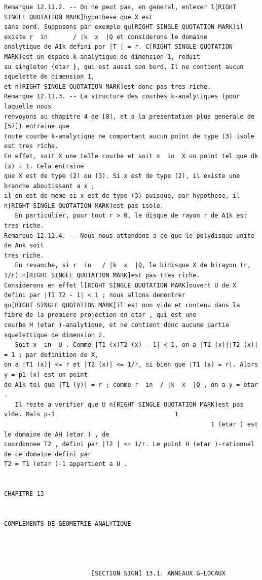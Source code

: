 \documentclass[
  11pt,
]{article}
\begin{document}
\begin{lstlisting}
Remarque 12.11.2. -- On ne peut pas, en general, enlever l[RIGHT SINGLE QUOTATION MARK]hypothese que X est
sans bord. Supposons par exemple qu[RIGHT SINGLE QUOTATION MARK]il existe r  in       / |k  x  |Q et considerons le domaine
analytique de A1k defini par |T | = r. C[RIGHT SINGLE QUOTATION MARK]est un espace k-analytique de dimension 1, reduit
au singleton {etar }, qui est aussi son bord. Il ne contient aucun squelette de dimension 1,
et n[RIGHT SINGLE QUOTATION MARK]est donc pas tres riche.
Remarque 12.11.3. -- La structure des courbes k-analytiques (pour laquelle nous
renvoyons au chapitre 4 de [8], et a la presentation plus generale de [57]) entraine que
toute courbe k-analytique ne comportant aucun point de type (3) isole est tres riche.
En effet, soit X une telle courbe et soit x  in  X un point tel que dk (x) = 1. Cela entraine
que X est de type (2) ou (3). Si x est de type (2), il existe une branche aboutissant a x ;
il en est de meme si x est de type (3) puisque, par hypothese, il n[RIGHT SINGLE QUOTATION MARK]est pas isole.
   En particulier, pour tout r > 0, le disque de rayon r de A1k est tres riche.
Remarque 12.11.4. -- Nous nous attendons a ce que le polydisque unite de Ank soit
tres riche.
   En revanche, si r  in   / |k  x  |Q, le bidisque X de birayon (r, 1/r) n[RIGHT SINGLE QUOTATION MARK]est pas tres riche.
Considerons en effet l[RIGHT SINGLE QUOTATION MARK]ouvert U de X defini par |T1 T2 - 1| < 1 ; nous allons demontrer
qu[RIGHT SINGLE QUOTATION MARK]il est non vide et contenu dans la fibre de la premiere projection en etar , qui est une
courbe H (etar )-analytique, et ne contient donc aucune partie squelettique de dimension 2.
   Soit x  in  U . Comme |T1 (x)T2 (x) - 1| < 1, on a |T1 (x)||T2 (x)| = 1 ; par definition de X,
on a |T1 (x)| <= r et |T2 (x)| <= 1/r, si bien que |T1 (x) = r|. Alors y = p1 (x) est un point
de A1k tel que |T1 (y)| = r ; comme r  in  / |k  x  |Q , on a y = etar .
   Il reste a verifier que U n[RIGHT SINGLE QUOTATION MARK]est pas vide. Mais p-1                                 1
                                                         1 (etar ) est le domaine de AH (etar ) , de
coordonnee T2 , defini par |T2 | <= 1/r. Le point H (etar )-rationnel de ce domaine defini par
T2 = T1 (etar )-1 appartient a U .


CHAPITRE 13


COMPLEMENTS DE GEOMETRIE ANALYTIQUE




                        [SECTION SIGN] 13.1. ANNEAUX G-LOCAUX


\end{lstlisting}
\end{document}
